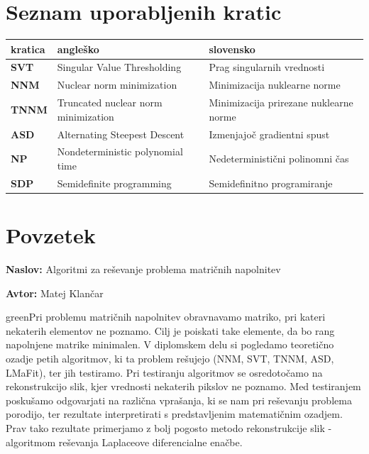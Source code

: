\documentclass[a4paper,12pt,openright]{book}
\newcommand{\ttitle}{Algoritmi za reševanje problema matričnih napolnitev}
\newcommand{\tauthor}{Matej Klančar}
\newcommand{\clearemptydoublepage}{\newpage{\pagestyle{empty}\cleardoublepage}}
\newcommand{\CG}[1]{\begin{color}{green}#1\end{color}}
\begin{document}
\chapter*{Seznam uporabljenih kratic}

\noindent\begin{tabular}{p{}|p{}|p{}}    %
    {\bf kratica} & {\bf angleško}                      & {\bf slovensko}                        \\ \hline
    {\bf SVT }    & Singular Value Thresholding         & Prag singularnih vrednosti             \\
    {\bf NNM}     & Nuclear norm minimization           & Minimizacija nuklearne norme           \\
    {\bf TNNM}    & Truncated nuclear norm minimization & Minimizacija prirezane nuklearne norme \\
    {\bf ASD}     & Alternating Steepest Descent        & Izmenjajoč gradientni spust            \\
    {\bf NP}     & Nondeterministic polynomial time       & Nedeterministični polinomni čas            \\
    {\bf SDP}     & Semidefinite programming        & Semidefinitno programiranje            
\end{tabular}


\clearemptydoublepage

{}
\chapter*{Povzetek}

\noindent\textbf{Naslov:} \ttitle
\bigskip

\noindent\textbf{Avtor:} \tauthor
\bigskip

\noindent \CG{Pri problemu matričnih napolnitev obravnavamo matriko, pri kateri nekaterih elementov ne poznamo. Cilj je poiskati take elemente, da bo rang napolnjene matrike minimalen. V diplomskem delu si pogledamo teoretično ozadje petih algoritmov, ki ta problem rešujejo (NNM, SVT, TNNM, ASD, LMaFit), ter jih testiramo. Pri testiranju algoritmov se osredotočamo na rekonstrukcijo slik, kjer vrednosti nekaterih pikslov ne poznamo. Med testiranjem poskušamo odgovarjati na različna vprašanja, ki se nam pri reševanju problema porodijo, ter rezultate interpretirati s predstavljenim matematičnim ozadjem. Prav tako rezultate primerjamo z bolj pogosto metodo rekonstrukcije slik - algoritmom reševanja Laplaceove diferencialne enačbe.}
\end{document}
